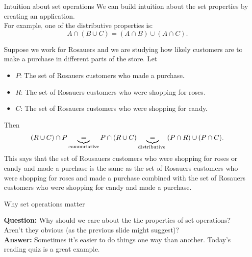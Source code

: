 \documentclass[10pt]{beamer}
\begin{document}
\begin{frame}{Intuition about set operations}
\footnotesize 
We can build intuition about the set properties by creating an application.
\\
For example, one of the distributive properties is:
\[ A \cap (B \cup C) = (A \cap B) \cup (A \cap C). \]

Suppose we work for Rosauers and we are studying how likely customers are to make a purchase in different parts of the store.  Let  
\begin{itemize}
\item $P$: The set of Rosauers customers who made a purchase. 
\item $R$: The set of Rosauers customers who were shopping for roses.
\item $C$: The set of Rosauers customers who were shopping for candy.
\end{itemize}

Then
\[ (R \cup C)  \cap P \explaintermbrace{commutative}{=}  P \cap (R \cup C) \explaintermbrace{distributive }{=} (P \cap R) \cup (P \cap C). \]
This says that the set of Rousauers customers who were shopping for roses or candy and made a purchase is the same as the set of Rosauers customers who were shopping for roses and made a purchase combined with the set of Rosauers customers who were shopping for candy and made a purchase.
	
\end{frame}


\begin{frame}{Why set operations matter}
	
\textbf{Question:} Why should we care about the the properties of set operations?  Aren't they obvious (as the previous slide might suggest)? \\
\vfill 
\textbf{Answer:} Sometimes it's easier to do things one way than another. Today's reading quiz is a great example. \\

\end{frame}
\end{document}
